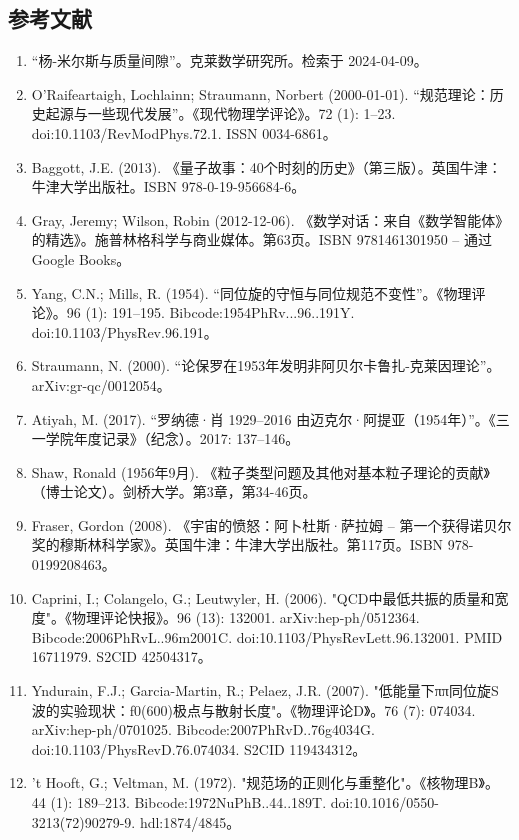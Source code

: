 \subsection{参考文献}
\begin{enumerate}
\item “杨-米尔斯与质量间隙”。克莱数学研究所。检索于 2024-04-09。
\item O’Raifeartaigh, Lochlainn; Straumann, Norbert (2000-01-01). “规范理论：历史起源与一些现代发展”。《现代物理学评论》。72 (1): 1–23. doi:10.1103/RevModPhys.72.1. ISSN 0034-6861。
\item Baggott, J.E. (2013). 《量子故事：40个时刻的历史》（第三版）。英国牛津：牛津大学出版社。ISBN 978-0-19-956684-6。
\item  Gray, Jeremy; Wilson, Robin (2012-12-06). 《数学对话：来自《数学智能体》的精选》。施普林格科学与商业媒体。第63页。ISBN 9781461301950 – 通过Google Books。
\item Yang, C.N.; Mills, R. (1954). “同位旋的守恒与同位规范不变性”。《物理评论》。96 (1): 191–195. Bibcode:1954PhRv...96..191Y. doi:10.1103/PhysRev.96.191。
\item Straumann, N. (2000). “论保罗在1953年发明非阿贝尔卡鲁扎-克莱因理论”。arXiv:gr-qc/0012054。
\item Atiyah, M. (2017). “罗纳德·肖 1929–2016 由迈克尔·阿提亚（1954年）”。《三一学院年度记录》（纪念）。2017: 137–146。
\item Shaw, Ronald (1956年9月). 《粒子类型问题及其他对基本粒子理论的贡献》（博士论文）。剑桥大学。第3章，第34-46页。
\item Fraser, Gordon (2008). 《宇宙的愤怒：阿卜杜斯·萨拉姆 – 第一个获得诺贝尔奖的穆斯林科学家》。英国牛津：牛津大学出版社。第117页。ISBN 978-0199208463。
\item Caprini, I.; Colangelo, G.; Leutwyler, H. (2006). "QCD中最低共振的质量和宽度"。《物理评论快报》。96 (13): 132001. arXiv:hep-ph/0512364. Bibcode:2006PhRvL..96m2001C. doi:10.1103/PhysRevLett.96.132001. PMID 16711979. S2CID 42504317。 
\item Yndurain, F.J.; Garcia-Martin, R.; Pelaez, J.R. (2007). "低能量下ππ同位旋S波的实验现状：f0(600)极点与散射长度"。《物理评论D》。76 (7): 074034. arXiv:hep-ph/0701025. Bibcode:2007PhRvD..76g4034G. doi:10.1103/PhysRevD.76.074034. S2CID 119434312。
\item 't Hooft, G.; Veltman, M. (1972). "规范场的正则化与重整化"。《核物理B》。44 (1): 189–213. Bibcode:1972NuPhB..44..189T. doi:10.1016/0550-3213(72)90279-9. hdl:1874/4845。
\end{enumerate}